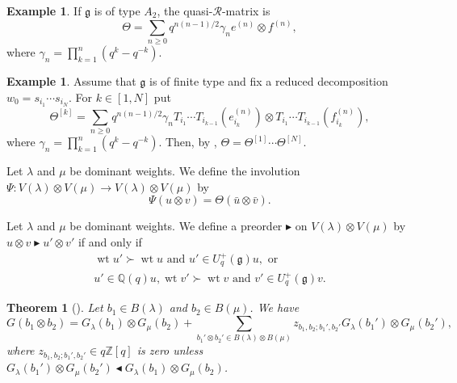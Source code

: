 \documentclass[final]{amsart}
\theoremstyle{plain}
\newtheorem{theorem}[corollary]{Theorem}
\theoremstyle{definition}
\newtheorem{example}[corollary]{Example}
\newcommand{\calR}{\mathcal R}
\newcommand{\bbQ}{\mathbb Q}
\newcommand{\bbZ}{\mathbb Z}
\newcommand{\frakg}{\mathfrak g}
\DeclareMathOperator{\weight}{wt}
\begin{document}
\begin{example}
    If $\frakg$ is of type $A_2$, the quasi-$\calR$-matrix is
    \[
        \Theta = \sum_{n\ge 0} q^{n(n-1)/2} \gamma_n e^{(n)} \otimes f^{(n)},
    \]
    where $\gamma_n = \prod_{k=1}^n (q^k-q^{-k})$.
\end{example}

\begin{example}
    \label{example:quasi-r-matrix-finite-type}
    Assume that $\frakg$ is of finite type and fix a reduced decomposition $w_0 = s_{i_1} \cdots s_{i_N}$.
    For $k\in [1, N]$ put
    \[
        \Theta^{[k]} = \sum_{n\ge 0} q^{n(n-1)/2} \gamma_n T_{i_1} \cdots T_{i_{k-1}}(e_{i_k}^{(n)}) \otimes T_{i_1} \cdots T_{i_{k-1}}(f_{i_k}^{(n)}),
    \]
    where $\gamma_n = \prod_{k=1}^n (q^k-q^{-k})$.
    Then, by \cite[Section 8.30]{Jantzen:Lectures-QuantumGroups}, $\Theta = \Theta^{[1]} \cdots \Theta^{[N]}$.
\end{example}

Let $\lambda$ and $\mu$ be dominant weights.
We define the involution $\Psi\colon V(\lambda) \otimes V(\mu) \to V(\lambda) \otimes V(\mu)$ by
\begin{equation}
    \label{equation:involution-tensor-product}
    \Psi(u\otimes v) = \Theta(\bar{u} \otimes \bar{v}).
\end{equation}

Let $\lambda$ and $\mu$ be dominant weights.
We define a preorder $\blacktriangleright$ on $V(\lambda) \otimes V(\mu)$ by $u \otimes v \blacktriangleright u' \otimes v'$ if and only if
\begin{equation}
    \label{equation:definition-preorder-tensor-product}
    \begin{gathered}
        \weight u' \succ \weight u \text{ and } u' \in U_q^+(\frakg) u, \text{ or } \\
        u' \in \bbQ(q) u, \weight v' \succ \weight v \text{ and } v' \in U_q^+(\frakg) v.
    \end{gathered}
\end{equation}

\begin{theorem}[{\cite[Theorem 27.3.2]{Lusztig:IntroductionToQuantumGroups}}]
    \label{theorem:canonical-basis-tensor-product}
    Let $b_1\in B(\lambda)$ and $b_2\in B(\mu)$. We have
    \[
        G(b_1\otimes b_2) = G_\lambda(b_1)\otimes G_\mu(b_2) + \sum_{b_1'\otimes b_2' \in B(\lambda) \otimes B(\mu)} z_{b_1,b_2;b_1',b_2'} G_\lambda(b_1') \otimes G_\mu(b_2'),
    \]
    where $z_{b_1,b_2;b_1',b_2'} \in q\bbZ[q]$ is zero unless $G_\lambda(b_1') \otimes G_\mu(b_2') \blacktriangleleft G_\lambda(b_1)\otimes G_\mu(b_2)$.
\end{theorem}
\end{document}
